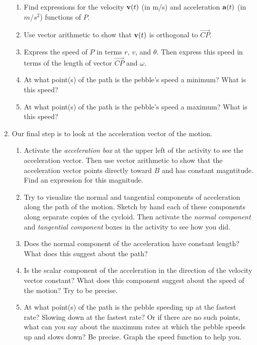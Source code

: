 \documentclass{ximera}
\begin{document}
\begin{question}
\begin{enumerate}
\begin{enumerate}
\item Find expressions for the velocity ${\bf v}(t)$ (in m/s) and acceleration ${\bf a}(t)$ (in $m/s^2$) functions of $P$.

\item Use vector arithmetic to show that ${\bf v}(t)$ is orthogonal to $\overrightarrow{ CP}$.

\item Express the speed of $P$ in terms $r$, $v$, and $\theta$. Then express this speed in terms of the length of vector $\overrightarrow{CP}$ and $\omega$.

\item At what point(s) of the path is the pebble's speed a minimum? What is this speed?

\item At what point(s) of the path is the pebble's speed a maximum? What is this speed?
\end{enumerate}

\item Our final step is to look at the acceleration vector of the motion.

\begin{enumerate}
\item Activate the \emph{acceleration box} at the upper left of the activity to see the acceleration vector. Then use vector arithmetic to show that the acceleration vector points directly toward $B$ and has constant magntitude. Find an expression for this magnitude.

\item Try to visualize the normal and tangential components of acceleration along the path of the motion. Sketch by hand each of these components along separate copies of the cycloid. Then activate the \emph{normal component} and \emph{tangential component} boxes in the activity to see how you did.

\item Does the normal component of the acceleration have constant length? What does this suggest about the path?

\item Is the scalar component of the acceleration in the direction of the velocity vector constant? What does this component suggest about the speed of the motion? Try to be precise.

\item At what point(s) of the path is the pebble speeding up at the fastest rate? Slowing down at the fastest rate? Or if there are no such points, what can you say about the maximum rates at which the pebble speeds up and slows down? Be precise. Graph the speed function to help you.

\end{enumerate}

\end{enumerate}

\end{question}
\end{document}
